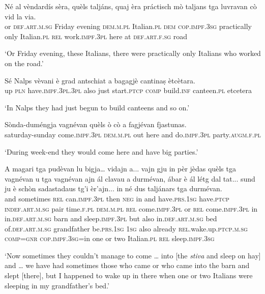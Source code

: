 \begin{linenumbers}
\gll Né al vèndardís sèra, quèls taljáns, quaj èra práctisch mò taljans tga luvravan cò vid la via. \\
or \textsc{def.art.m.sg} Friday evening \textsc{dem.m.pl} Italian.\textsc{pl} \textsc{dem} \textsc{cop.impf.3sg}  practically only  Italian.\textsc{pl} \textsc{rel} work.\textsc{impf.3pl} here at  \textsc{def.art.f.sg} road  \\
\end{linenumbers}
\medskip
\glt `Or Friday evening, these Italians, there were practically only Italians who worked on the road.'
\medskip

\begin{linenumbers}
\gll  Sé Nalps vèvani è grad antschiat a bagagjè cantinaṣ ètcètara.  \\
up \textsc{pln} have.\textsc{impf.3pl.3pl} also just start.\textsc{ptcp}  \textsc{comp} build.\textsc{inf} canteen.\textsc{pl} etcetera  \\
\end{linenumbers}
\medskip
\glt `In Nalps they had just begun to build canteens and so on.'
\medskip

\begin{linenumbers}
\gll Sònda-duméngja vagnévan quèls ò cò a fagjévan fjastunas.\\
saturday-sunday come.\textsc{impf.3pl} \textsc{dem.m.pl} out here and do.\textsc{impf.3pl} party.\textsc{augm.f.pl}\\
\end{linenumbers}
\medskip
\glt `During week-end they would come here and have big parties.'
\medskip

\begin{linenumbers}
\gll A  magari tga pudèvan lu bigja… vidajn a... vajn gju in pèr jèdas quèls tga vagnévan u tga vagnévan ajn ál clavau a durmévan, ábar è ál létg dal tat... sund ju è schòn sadastadaus tg'i èr'ajn... in né dus taljánars tga durmévan.\\
and sometimes  \textsc{rel} can.\textsc{impf.3pl} then \textsc{neg} in  and  have.\textsc{prs.1sg} have.\textsc{ptcp} \textsc{indef.art.m.sg} pair  time.\textsc{f.pl} \textsc{dem.m.pl} \textsc{rel} come.\textsc{impf.3pl} or \textsc{rel} come.\textsc{impf.3pl} in  in.\textsc{def.art.m.sg} barn  and sleep.\textsc{impf.3pl} but also  in.\textsc{def.art.m.sg} bed of.\textsc{def.art.m.sg} grandfather  be.\textsc{prs.1sg} \textsc{1sg} also already \textsc{rel.}wake.up.\textsc{ptcp.m.sg} \textsc{comp=gnr} \textsc{cop.impf.3sg=}in one or two Italian.\textsc{pl} \textsc{rel} sleep.\textsc{impf.3sg}  \\
\end{linenumbers}
\medskip
\glt `Now sometimes they couldn’t manage to come … into [the \textit{stiva} and sleep on hay] and … we have had sometimes those who came or who came into the barn and slept [there], but I happened to wake up in there when one or two Italians were sleeping in my grandfather’s bed.'
\medskip

